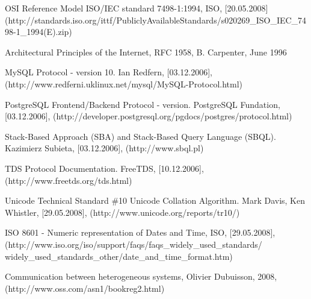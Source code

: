OSI Reference Model ISO/IEC standard 7498-1:1994, ISO,
[20.05.2008] (http://standards.iso.org/ittf/PubliclyAvailableStandards/s020269\_ISO\_IEC\_7498-1\_1994(E).zip)
	
 Architectural Principles of the Internet, RFC 1958, B.
Carpenter, June 1996

MySQL Protocol - version 10. Ian Redfern,
[03.12.2006], (http://www.redferni.uklinux.net/mysql/MySQL-Protocol.html) 

PostgreSQL Frontend/Backend Protocol - version.
PostgreSQL Fundation, [03.12.2006],
(http://developer.postgresql.org/pgdocs/postgres/protocol.html)

Stack-Based Approach (SBA) and Stack-Based Query Language
(SBQL). Kazimierz Subieta, [03.12.2006], (http://www.sbql.pl)

TDS Protocol Documentation. FreeTDS, [10.12.2006],
(http://www.freetds.org/tds.html)

Unicode Technical Standard \#10 Unicode Collation
Algorithm. Mark Davis, Ken Whistler, [29.05.2008], (http://www.unicode.org/reports/tr10/)

ISO 8601 - Numeric representation of Dates and Time,
ISO, [29.05.2008],
(http://www.iso.org/iso/support/faqs/faqs\_widely\_used\_standards/ widely\_used\_standards\_other/date\_and\_time\_format.htm)

 Communication between heterogeneous systems, Olivier
Dubuisson, 2008, (http://www.oss.com/asn1/bookreg2.html)
